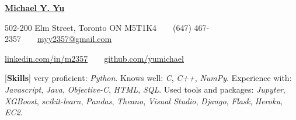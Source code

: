 \documentclass[10pt,letterpaper]{article}
\newcommand*\kw\textit
\begin{document}
\pagestyle{empty}
\begin{center}
{\huge\textbf{\href{https://github.com/yumichael/resume-v5}{Michael Y. Yu}}}

502-200 Elm Street, Toronto ON M5T1K4\ \ \textbullet\ \ (647) 467-2357\ \ \textbullet\ \ \href{mailto:myy2357@gmail.com}{myy2357@gmail.com}

\href{https://www.linkedin.com/in/m2357/}{linkedin.com/in/m2357}\ \ \textbullet\ \ \href{https://github.com/yumichael}{github.com/yumichael}
\end{center}
[\textbf{Skills}] very proficient: \kw{Python}. Knows well: \kw{C}, \kw{C++}, \kw{NumPy}. Experience with: \kw{Javascript}, \kw{Java}, \kw{Objective-C}, \kw{HTML}, \kw{SQL}. Used tools and packages: \kw{Jupyter}, \kw{XGBoost}, \kw{scikit-learn}, \kw{Pandas}, \kw{Theano}, \kw{Visual Studio}, \kw{Django}, \kw{Flask}, \kw{Heroku}, \kw{EC2}.
\end{document}
